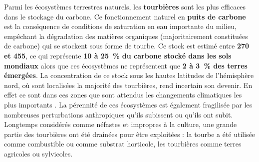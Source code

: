 Parmi les écosystèmes terrestres naturels, les \textbf{tourbières} sont les plus efficaces dans le stockage du carbone.
Ce fonctionnement naturel en \textbf{puits de carbone} est la conséquence de conditions de saturation en eau importante du milieu, empêchant la dégradation des matières organiques (majoritairement constituées de carbone)  qui se stockent sous forme de tourbe.
Ce stock est estimé entre \textbf{270 et  \SI{455}{\pgc}}, ce qui représente \textbf{10 à \SI{25}{\percent} du carbone stocké dans les sols mondiaux} alors que ces écosystèmes ne représentent que \textbf{2 à \SI{3}{\percent} des terres émergées}.
La concentration de ce stock sous les hautes latitudes de l'hémisphère nord, où sont localisées la majorité des tourbières, rend incertain son devenir. 
En effet ce sont dans ces zones que sont attendus les changements climatiques les plus importants \citep{Ciais2014}.
La pérennité de ces écosystèmes est également fragilisée par les nombreuses perturbations anthropiques qu'ils subissent ou qu'ils ont subit.
Longtemps considérés comme néfastes et impropres à la culture, une grande partie des tourbières ont été drainées pour être exploitées : la tourbe a été utilisée comme combustible ou comme substrat horticole, les tourbières comme terres agricoles ou sylvicoles.

